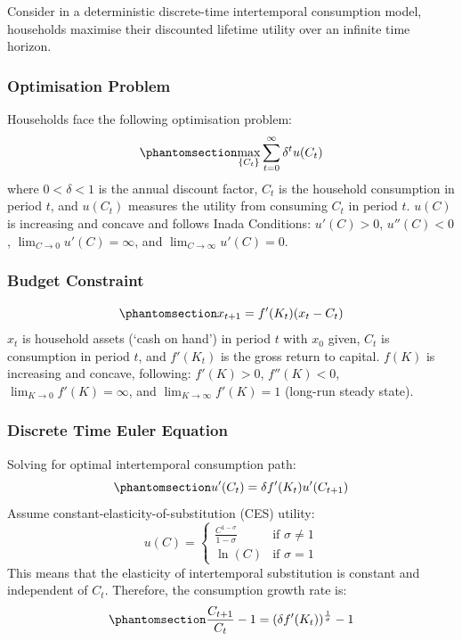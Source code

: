 \documentclass[
  11pt]{article}
\begin{document}
Consider in a deterministic discrete-time intertemporal consumption
model, households maximise their discounted lifetime utility over an
infinite time horizon.

\subsubsection*{Optimisation Problem}\label{optimisation-problem}

Households face the following optimisation
problem:\begin{equation}\phantomsection\label{eq-optimisation}{
\max_{\{C_t\}} \sum_{t=0}^\infty \delta^t u(C_t)
}\end{equation} where \(0<\delta<1\) is the annual discount factor,
\(C_t\) is the household consumption in period \(t\), and \(u(C_t)\)
measures the utility from consuming \(C_t\) in period \(t\). \(u(C)\) is
increasing and concave and follows Inada Conditions: \(u'(C) > 0\),
\(u''(C) < 0\), \(\lim_{C \to 0} u'(C) = \infty\), and
\(\lim_{C \to \infty} u'(C) = 0\).

\subsubsection*{Budget Constraint}\label{budget-constraint}

\begin{equation}\phantomsection\label{eq-budget}{
x_{t+1} = f'(K_t)(x_t - C_t)
}\end{equation}\(x_t\) is household assets (`cash on hand') in period
\(t\) with \(x_0\) given, \(C_t\) is consumption in period \(t\), and
\(f'(K_t)\) is the gross return to capital. \(f(K)\) is increasing and
concave, following: \(f'(K) > 0\), \(f''(K) < 0\),
\(\lim_{K \to 0} f'(K) = \infty\), and \(\lim_{K \to \infty} f'(K) = 1\)
(long-run steady state).

\subsubsection*{Discrete Time Euler
Equation}\label{discrete-time-euler-equation}

Solving for optimal intertemporal consumption
path:\begin{equation}\phantomsection\label{eq-euler}{
u'(C_t) = \delta f'(K_t) u'(C_{t+1})
}\end{equation} Assume constant-elasticity-of-substitution (CES)
utility:\[
u(C) = 
\begin{cases}
    \frac{C^{1-\sigma}}{1-\sigma} & \text{if } \sigma \ne 1\\
    \ln(C) & \text{if } \sigma = 1
\end{cases}
\]This means that the elasticity of intertemporal substitution is
constant and independent of \(C_t\). Therefore, the consumption growth
rate is:\begin{equation}\phantomsection\label{eq-growth}{
\frac{C_{t+1}}{C_t} - 1 = (\delta f'(K_t))^{\frac{1}{\sigma}} - 1
}\end{equation}
\end{document}
